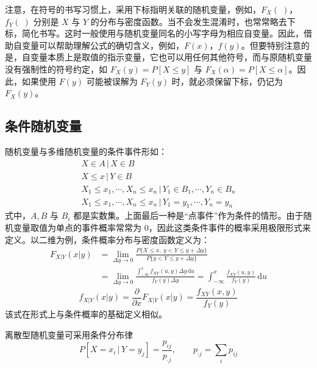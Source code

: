 \documentclass[11pt,openany,UTF8]{ctexbook}
\newcommand{\dif}{\mathrm{d}}                      %
\begin{document}
注意\nobreak，在符号的书写习惯上\nobreak，采用下标指明关联的随机变量\nobreak，例如\nobreak，$F_X(\;)$\nobreak，$f_Y(\;)$ 分别是 $X$ 与 $Y$ 的分布与密度函数\nobreak。当不会发生混淆时\nobreak，也常常略去下标\nobreak，简化书写\nobreak。这时一般使用与随机变量同名的小写字母为相应自变量\nobreak。因此\nobreak，借助自变量可以帮助理解公式的确切含义\nobreak，例如\nobreak，$F(x)$\nobreak，$f(y)$\nobreak。但要特别注意的是\nobreak，自变量本质上是取值的指示变量\nobreak，它也可以用任何其他符号\nobreak，而与原随机变量没有强制性的符号约定\nobreak，如 $F_X(y)=P[X\leqslant y]$ 与 $F_X(\alpha)=P[X\leqslant\alpha]$\nobreak。因此\nobreak，如果使用 $F(y)$ 可能被误解为 $F_Y(y)$ 时\nobreak，就必须保留下标\nobreak，仍记为 $F_X(y)$\nobreak。

\subsection{条件随机变量}

随机变量与多维随机变量的条件事件形如\nobreak：
\[
\begin{gathered}
X\in A\,|\,X\in B\\
X\leqslant x\,|\,Y\in B\\
X_1\leqslant x_1,\cdots,X_n\leqslant x_n\,|\,Y_1\in B_1,\cdots,Y_n\in B_n\\
X_1\leqslant x_1,\cdots,X_n\leqslant x_n\,|\,Y_1=y_1,\cdots,Y_n=y_n
\end{gathered}
\]
式中\nobreak，$A,B$ 与 $B_i$ 都是实数集\nobreak。上面最后一种是“点事件”作为条件的情形\nobreak。由于随机变量取值为单点的事件概率常常为 0\nobreak，因此这类条件事件的概率采用极限形式来定义\nobreak。以二维为例\nobreak，条件概率分布与密度函数定义为\nobreak：
\begin{equation}
\begin{aligned}
F_{X|Y}(x|y)&=\lim_{\Delta y\to 0}
\frac{P\{X\leqslant x,\ y<Y\leqslant y+\Delta y\}}{P\{y<Y\leqslant y+\Delta y\}}\\
&=\lim_{\Delta y\to 0}\frac{\displaystyle\int_{-\infty}^{x}f_{XY}(u,y)\Delta y\,\dif u}{f_Y(y)\Delta y}
=\int_{-\infty}^{x}\frac{f_{XY}(u,y)}{f_Y(y)}\,\dif u
\end{aligned}
\label{eq:1.18}
\end{equation}
\begin{equation}
f_{X|Y}(x|y)=\frac{\partial}{\partial x}F_{X|Y}(x|y)=\frac{f_{XY}(x,y)}{f_Y(y)}
\label{eq:1.19}
\end{equation}
该式在形式上与条件概率的基础定义相似\nobreak。

离散型随机变量可采用条件分布律
\begin{equation}
P[X=x_i\,|\,Y=y_j]=\frac{p_{ij}}{p_{\cdot j}},\qquad
p_{\cdot j}=\sum_{i}p_{ij}
\label{eq:1.20}
\end{equation}
\end{document}
